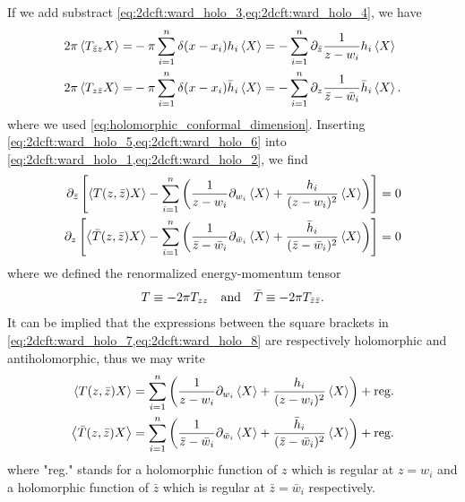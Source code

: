 \documentclass[10pt]{article}
\begin{document}
If we add substract \cref{eq:2dcft:ward_holo_3,eq:2dcft:ward_holo_4}, we have
\begin{subequations}
    \begin{align}
        2\pi\expval{T_{\bar{z}z}X}= & -\pi\sum_{i=1}^n\delta(x-x_i)h_i\expval{X}= -\sum_{i=1}^n\partial_{\bar{z}}\frac{1}{z-w_i}h_i\expval{X}\label{eq:2dcft:ward_holo_5}                  \\
        2\pi\expval{T_{z\bar{z}}X}= & -\pi\sum_{i=1}^n\delta(x-x_i)\bar{h}_i\expval{X}= -\sum_{i=1}^n\partial_z\frac{1}{\bar{z}-\bar{w}_i}\bar{h}_i\expval{X}.\label{eq:2dcft:ward_holo_6}
    \end{align}
\end{subequations}
where we used \cref{eq:holomorphic_conformal_dimension}.
Inserting \cref{eq:2dcft:ward_holo_5,eq:2dcft:ward_holo_6} into \cref{eq:2dcft:ward_holo_1,eq:2dcft:ward_holo_2}, we find
\begin{subequations}
    \begin{align}
        \partial_{\bar{z}}\left[\expval{T(z,\bar{z})X}-\sum_{i=1}^n\left(\frac{1}{z-w_i}\partial_{w_i}\expval{X}+\frac{h_i}{(z-w_i)^2}\expval{X}\right)\right]                                   & =0\label{eq:2dcft:ward_holo_7} \\
        \partial_z\left[\expval{\bar{T}(z,\bar{z})X}-\sum_{i=1}^n\left(\frac{1}{\bar{z}-\bar{w}_i}\partial_{\bar{w}_i}\expval{X}+\frac{\bar{h}_i}{(\bar{z}-\bar{w}_i)^2}\expval{X}\right)\right] & =0\label{eq:2dcft:ward_holo_8}
    \end{align}
\end{subequations}
where we defined the renormalized energy-momentum tensor
\begin{align}
    T\equiv-2\pi T_{zz}\qand\bar{T}\equiv-2\pi T_{\bar{z}\bar{z}}.\label{eq:2dcft:ward:def_renormalized_T}
\end{align}
It can be implied that the expressions between the square brackets in \cref{eq:2dcft:ward_holo_7,eq:2dcft:ward_holo_8} are respectively holomorphic and antiholomorphic, thus we may write
\begin{subequations}
    \begin{align}
        \expval{T(z,\bar{z})X}       & =\sum_{i=1}^n\left(\frac{1}{z-w_i}\partial_{w_i}\expval{X}+\frac{h_i}{(z-w_i)^2}\expval{X}\right)+\text{reg.}                                     \\
        \expval{\bar{T}(z,\bar{z})X} & =\sum_{i=1}^n\left(\frac{1}{\bar{z}-\bar{w}_i}\partial_{\bar{w}_i}\expval{X}+\frac{\bar{h}_i}{(\bar{z}-\bar{w}_i)^2}\expval{X}\right)+\text{reg.}
    \end{align}
\end{subequations}
where "reg." stands for a holomorphic function of $z$ which is regular at $z=w_i$ and a holomorphic function of $\bar{z}$ which is regular at $\bar{z}=\bar{w}_i$ respectively.
\end{document}
